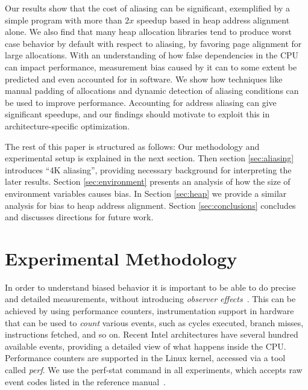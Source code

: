 \documentclass[prodmode,acmtaco]{acmsmall}
\begin{document}
Our results show that the cost of aliasing can be significant, exemplified by a simple program with more than $2x$ speedup based in heap address alignment alone.
We also find that many heap allocation libraries tend to produce worst case behavior by default with respect to aliasing, by favoring page alignment for large allocations.
With an understanding of how false dependencies in the CPU can impact performance, measurement bias caused by it can to some extent be predicted and even accounted for in software.
We show how techniques like manual padding of allocations and dynamic detection of aliasing conditions can be used to improve performance. 
Accounting for address aliasing can give significant speedups, and our findings should motivate to exploit this in architecture-specific optimization.

The rest of this paper is structured as follows: Our methodology and experimental setup is explained in the next section.
Then section \ref{sec:aliasing} introduces ``4K aliasing'', providing necessary background for interpreting the later results.
Section \ref{sec:environment} presents an analysis of how the size of environment variables causes bias.
In Section \ref{sec:heap} we provide a similar analysis for bias to heap address alignment.
Section \ref{sec:conclusions} concludes and discusses directions for future work.


\section{Experimental Methodology}
\label{sec:methodology}
In order to understand biased behavior it is important to be able to do precise and detailed measurements, without introducing \emph{observer effects}~\cite{Mytkowicz:2008:OE&MB}.
This can be achieved by using performance counters, instrumentation support in hardware that can be used to \emph{count} various events, such as cycles executed, branch misses, instructions fetched, and so on.
Recent Intel architectures have several hundred available events, providing a detailed view of what happens inside the CPU.
Performance counters are supported in the Linux kernel, accessed via a tool called \emph{perf}.
We use the perf-stat command in all experiments, which accepts raw event codes listed in the reference manual~\cite{Volume3B}.
\end{document}
